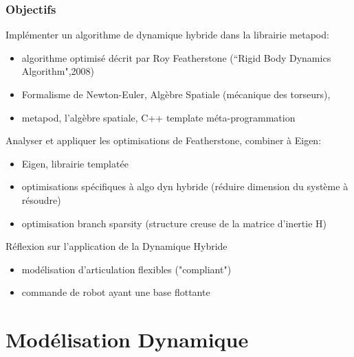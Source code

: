 \documentclass[10pt]{beamer}
\begin{document}
\begin{frame}
  \frametitle{Objectifs}
  
	Implémenter un algorithme de dynamique hybride dans la librairie metapod:
	\begin{itemize}
		\item algorithme optimisé décrit par Roy Featherstone (“Rigid Body Dynamics Algorithm",2008)
		\item Formalisme de Newton-Euler, Algèbre Spatiale (mécanique des torseurs),
		\item metapod, l'algèbre spatiale, C++ template méta-programmation
  \end{itemize}
  	Analyser et appliquer les optimisations de Featherstone, combiner à Eigen:
  	\begin{itemize}
		\item Eigen, librairie templatée
		\item optimisations spécifiques à algo dyn hybride (réduire dimension du système à résoudre)
		\item optimisation branch sparsity (structure creuse de la matrice d'inertie H)
  \end{itemize}
		
  Réflexion sur l'application de la Dynamique Hybride
  	\begin{itemize}
		\item modélisation d'articulation flexibles ("compliant")
		\item commande de robot ayant une base flottante
  \end{itemize}
	
\end{frame}

\section{Modélisation Dynamique}
\end{document}
